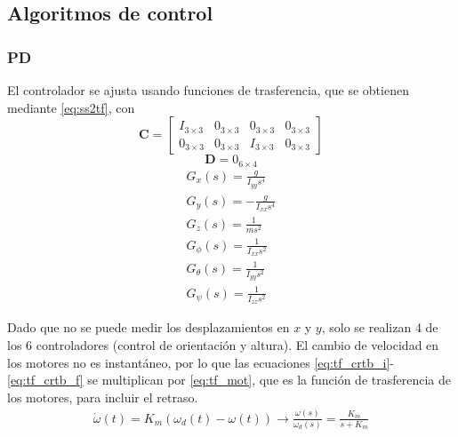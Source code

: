 \subsection{Algoritmos de control}
\subsubsection{PD}
El controlador se ajusta usando funciones de trasferencia, que se obtienen mediante \eqref{eq:ss2tf}, con
\[
\mathbf{C} = \begin{bmatrix}
	I_{3\times3} & \mathit{0}_{3\times3} & \mathit{0}_{3\times3} & \mathit{0}_{3\times3} \\
    \mathit{0}_{3\times3} & \mathit{0}_{3\times3} & I_{3\times3} & \mathit{0}_{3\times3}
\end{bmatrix}
\]
\[
\mathbf{D} = \mathit{0}_{6\times4}
\]
\begin{gather}
	G_x(s) = \frac{g}{I_{yy} s^4} \\
    G_y(s) = -\frac{g}{I_{xx} s^4} \\
    G_z(s) = \frac{1}{m s^2} \label{eq:tf_crtb_i} \\
    G_{\phi}(s) = \frac{1}{I_{xx} s^2} \\
    G_{\theta}(s) = \frac{1}{I_{yy} s^2} \\
    G_{\psi}(s) = \frac{1}{I_{zz} s^2} \label{eq:tf_crtb_f}
\end{gather}

Dado que no se puede medir los desplazamientos en $x$ y $y$, solo se realizan 4 de los 6 controladores (control de orientación y altura).
El cambio de velocidad en los motores no es instantáneo, por lo que las ecuaciones \eqref{eq:tf_crtb_i}-\eqref{eq:tf_crtb_f} se multiplican por \eqref{eq:tf_mot}, que es la
función de trasferencia de los motores, para incluir el retraso.
\begin{eqnarray}
	\label{eq:tf_mot}
	\dot{\omega}(t)=K_m(\omega_d(t)-\omega(t))\rightarrow \frac{\omega(s)}{\omega_d(s)} = \frac{K_m}{s+K_m}
\end{eqnarray}

